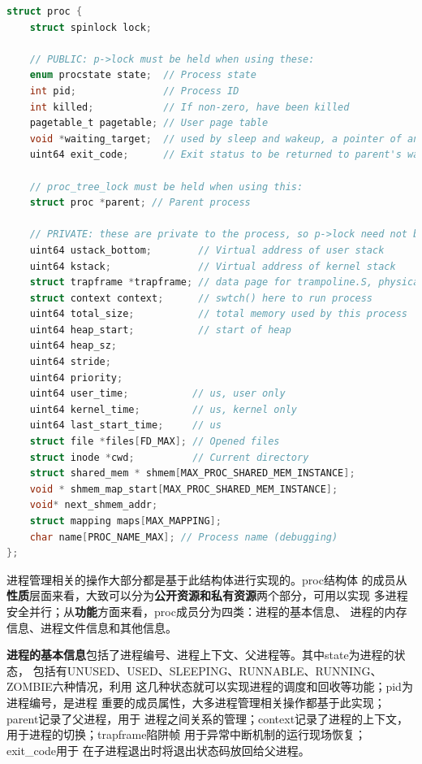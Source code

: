 \documentclass[UTF8,a4paper,10pt]{ctexart}
\begin{document}
\begin{lstlisting}[title=proc结构体,frame=trbl,language={C}]
  struct proc {
    struct spinlock lock;

    // PUBLIC: p->lock must be held when using these:
    enum procstate state;  // Process state
    int pid;               // Process ID
    int killed;            // If non-zero, have been killed
    pagetable_t pagetable; // User page table
    void *waiting_target;  // used by sleep and wakeup, a pointer of anything
    uint64 exit_code;      // Exit status to be returned to parent's wait

    // proc_tree_lock must be held when using this:
    struct proc *parent; // Parent process

    // PRIVATE: these are private to the process, so p->lock need not be held.
    uint64 ustack_bottom;        // Virtual address of user stack
    uint64 kstack;               // Virtual address of kernel stack
    struct trapframe *trapframe; // data page for trampoline.S, physical address
    struct context context;      // swtch() here to run process
    uint64 total_size;           // total memory used by this process
    uint64 heap_start;           // start of heap
    uint64 heap_sz;
    uint64 stride;
    uint64 priority;
    uint64 user_time;           // us, user only
    uint64 kernel_time;         // us, kernel only
    uint64 last_start_time;     // us
    struct file *files[FD_MAX]; // Opened files
    struct inode *cwd;          // Current directory
    struct shared_mem * shmem[MAX_PROC_SHARED_MEM_INSTANCE];
    void * shmem_map_start[MAX_PROC_SHARED_MEM_INSTANCE];
    void* next_shmem_addr;
    struct mapping maps[MAX_MAPPING];
    char name[PROC_NAME_MAX]; // Process name (debugging)
};
  \end{lstlisting}

进程管理相关的操作大部分都是基于此结构体进行实现的。proc结构体
的成员从\textbf{性质}层面来看，大致可以分为\textbf{公开资源和私有资源}两个部分，可用以实现
多进程安全并行；从\textbf{功能}方面来看，proc成员分为四类：进程的基本信息、
进程的内存信息、进程文件信息和其他信息。

\textbf{进程的基本信息}包括了进程编号、进程上下文、父进程等。其中state为进程的状态，
包括有UNUSED、USED、SLEEPING、RUNNABLE、RUNNING、ZOMBIE六种情况，利用
这几种状态就可以实现进程的调度和回收等功能；pid为进程编号，是进程
重要的成员属性，大多进程管理相关操作都基于此实现；parent记录了父进程，用于
进程之间关系的管理；context记录了进程的上下文，用于进程的切换；trapframe陷阱帧
用于异常中断机制的运行现场恢复；exit\_code用于
在子进程退出时将退出状态码放回给父进程。
\end{document}
